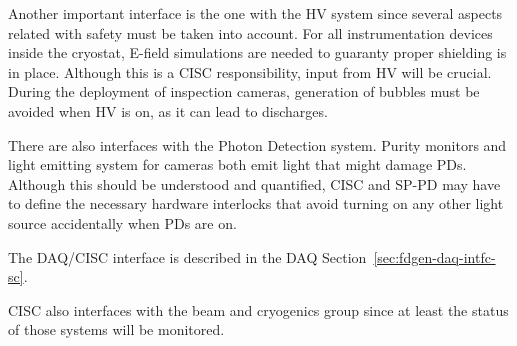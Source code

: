 Another important interface is the one with the HV system since several aspects related with safety must be taken into account. 
For all instrumentation devices inside the cryostat, E-field simulations are needed to guaranty proper shielding is in place.
Although this is a CISC responsibility, input from HV will be crucial.
During the deployment of inspection cameras, generation of bubbles must be avoided when HV is on, as it can lead to discharges.

There are also interfaces with the Photon Detection system. Purity monitors and light emitting system for cameras both emit light that might damage PDs.
Although this should be understood and quantified, CISC and SP-PD may have to define the necessary hardware interlocks
that avoid turning on any other light source accidentally when PDs are on.

The DAQ/CISC interface is described in the DAQ Section~\ref{sec:fdgen-daq-intfc-sc}. 





CISC also interfaces with the beam and cryogenics group since at least the status of those systems will be monitored.



